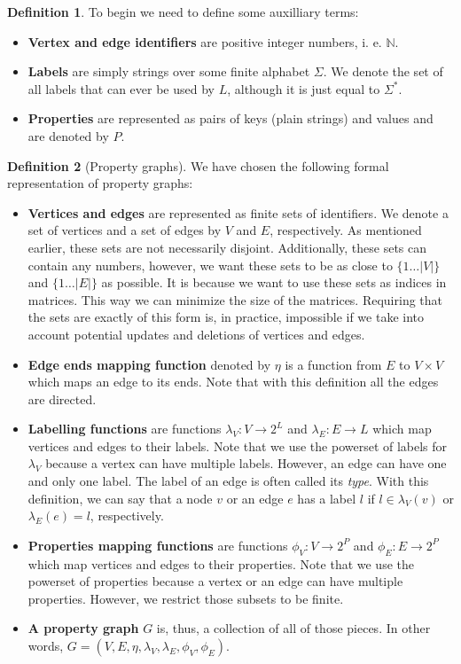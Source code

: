 \documentclass[14pt]{constructor-thesis}
\theoremstyle{definition}
\newtheorem*{definition}{Definition}
\begin{document}
\begin{definition}
  To begin we need to define some auxilliary terms: 
  \begin{itemize}
    \item \textbf{Vertex and edge identifiers} are positive integer numbers, i. e. $\mathbb{N}$.
    \item \textbf{Labels} are simply strings over some finite alphabet $\Sigma$. We denote the set of all labels that can ever be used by $L$, although it is just equal to $\Sigma^*$.
    \item \textbf{Properties} are represented as pairs of keys (plain strings) and values and are denoted by $P$.
  \end{itemize}
\end{definition}

\begin{definition}[Property graphs]
  We have chosen the following formal representation of property graphs:
  \begin{itemize}
    \item \textbf{Vertices and edges} are represented as finite sets of identifiers. We denote a set of vertices and a set of edges by $V$ and $E$, respectively. As mentioned earlier, these sets are not necessarily disjoint. Additionally, these sets can contain any numbers, however, we want these sets to be as close to $\{1 \dots |V|\}$ and $\{1 \dots |E|\}$ as possible. It is because we want to use these sets as indices in matrices. This way we can minimize the size of the matrices. Requiring that the sets are exactly of this form is, in practice, impossible if we take into account potential updates and deletions of vertices and edges.
    \item \textbf{Edge ends mapping function} denoted by $\eta$ is a function from $E$ to $V \times V$ which maps an edge to its ends. Note that with this definition all the edges are directed.
    \item \textbf{Labelling functions} are functions $\lambda_V : V \to 2^L$ and $\lambda_E : E \to L$ which map vertices and edges to their labels. Note that we use the powerset of labels for $\lambda_V$ because a vertex can have multiple labels. However, an edge can have one and only one label. The label of an edge is often called its \textit{type}. With this definition, we can say that a node $v$ or an edge $e$ has a label $l$ if $l \in \lambda_V(v)$ or $\lambda_E(e) = l$, respectively.
    \item \textbf{Properties mapping functions} are functions $\phi_V : V \to 2^P$ and $\phi_E : E \to 2^P$ which map vertices and edges to their properties. Note that we use the powerset of properties because a vertex or an edge can have multiple properties. However, we restrict those subsets to be finite.
    \item \textbf{A property graph} $G$ is, thus, a collection of all of those pieces. In other words, $G = (V, E, \eta, \lambda_V, \lambda_E, \phi_V, \phi_E)$.
  \end{itemize}
\end{definition}
\end{document}
